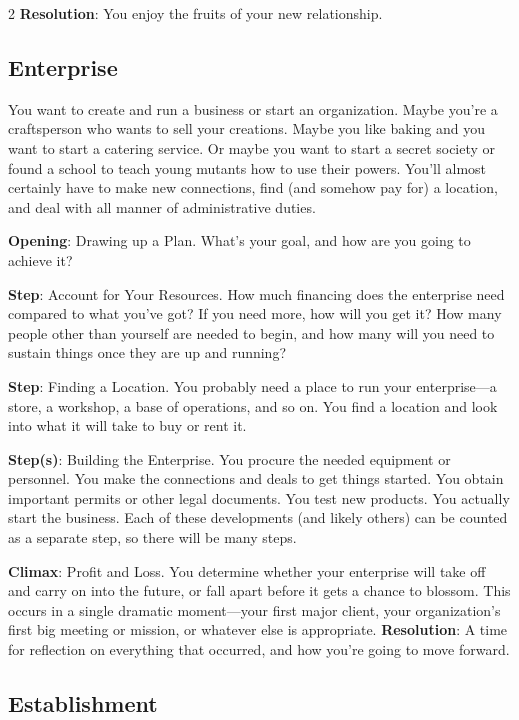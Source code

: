 \begin{multicols}{2}
\textbf{Resolution}: You enjoy the fruits of your new relationship.

\subsection{Enterprise}

You want to create and run a business or start an organization. Maybe you’re a craftsperson who wants to sell your creations. Maybe you like baking and you want to start a catering service. Or maybe you want to start a secret society or found a school to teach young mutants how to use their powers. You’ll almost certainly have to make new connections, find (and somehow pay for) a location, and deal with all manner of administrative duties.

\textbf{Opening}: Drawing up a Plan. What’s your goal, and how are you going to achieve it?

\textbf{Step}: Account for Your Resources. How much financing does the enterprise need compared to what you’ve got? If you need more, how will you get it? How many people other than yourself are needed to begin, and how many will you need to sustain things once they are up and running?

\textbf{Step}: Finding a Location. You probably need a place to run your enterprise—a store, a workshop, a base of operations, and so on. You find a location and look into what it will take to buy or rent it.

\textbf{Step(s)}: Building the Enterprise. You procure the needed equipment or personnel. You make the connections and deals to get things started. You obtain important permits or other legal documents. You test new products. You actually start the business. Each of these developments (and likely others) can be counted as a separate step, so there will be many steps.

\textbf{Climax}: Profit and Loss. You determine whether your enterprise will take off and carry on into the future, or fall apart before it gets a chance to blossom. This occurs in a single dramatic moment—your first major client, your organization’s first big meeting or mission, or whatever else is appropriate. 
\textbf{Resolution}: A time for reflection on everything that occurred, and how you’re going to move forward.

\subsection{Establishment}


\end{multicols}
